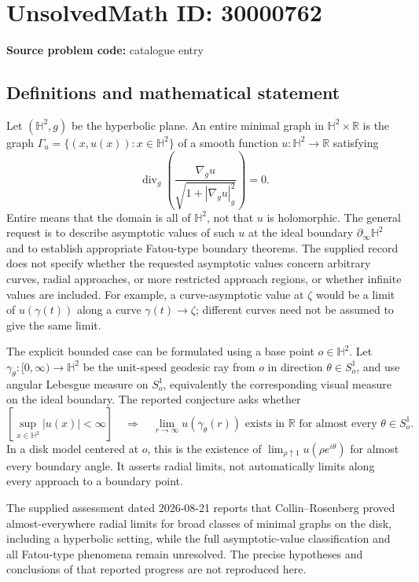 \documentclass[11pt]{article}
\newcommand{\R}{\mathbb{R}}
\begin{document}
\section*{UnsolvedMath ID: 30000762}
\textbf{Source problem code:} catalogue entry
\subsection{Definitions and mathematical statement}
Let \((\mathbb H^2,g)\) be the hyperbolic plane. An entire minimal graph in \(\mathbb H^2\times\R\) is the graph \(\Gamma_u=\{(x,u(x)):x\in\mathbb H^2\}\) of a smooth function \(u:\mathbb H^2\to\R\) satisfying
\[
 \operatorname{div}_g\left(\frac{\nabla_g u}{\sqrt{1+|\nabla_g u|_g^2}}\right)=0.
\]
Entire means that the domain is all of \(\mathbb H^2\), not that \(u\) is holomorphic. The general request is to describe asymptotic values of such \(u\) at the ideal boundary \(\partial_\infty\mathbb H^2\) and to establish appropriate Fatou-type boundary theorems. The supplied record does not specify whether the requested asymptotic values concern arbitrary curves, radial approaches, or more restricted approach regions, or whether infinite values are included. For example, a curve-asymptotic value at \(\zeta\) would be a limit of \(u(\gamma(t))\) along a curve \(\gamma(t)\to\zeta\); different curves need not be assumed to give the same limit.

The explicit bounded case can be formulated using a base point \(o\in\mathbb H^2\). Let \(\gamma_\theta:[0,\infty)\to\mathbb H^2\) be the unit-speed geodesic ray from \(o\) in direction \(\theta\in S_o^1\), and use angular Lebesgue measure on \(S_o^1\), equivalently the corresponding visual measure on the ideal boundary. The reported conjecture asks whether
\[
 \left[\sup_{x\in\mathbb H^2}|u(x)|<\infty\right]
 \quad\Longrightarrow\quad
 \lim_{r\to\infty}u(\gamma_\theta(r))\text{ exists in }\R
 \text{ for almost every }\theta\in S_o^1.
\]
In a disk model centered at \(o\), this is the existence of \(\lim_{\rho\uparrow1}u(\rho e^{i\theta})\) for almost every boundary angle. It asserts radial limits, not automatically limits along every approach to a boundary point.

The supplied assessment dated 2026-08-21 reports that Collin--Rosenberg proved almost-everywhere radial limits for broad classes of minimal graphs on the disk, including a hyperbolic setting, while the full asymptotic-value classification and all Fatou-type phenomena remain unresolved. The precise hypotheses and conclusions of that reported progress are not reproduced here.
\end{document}
